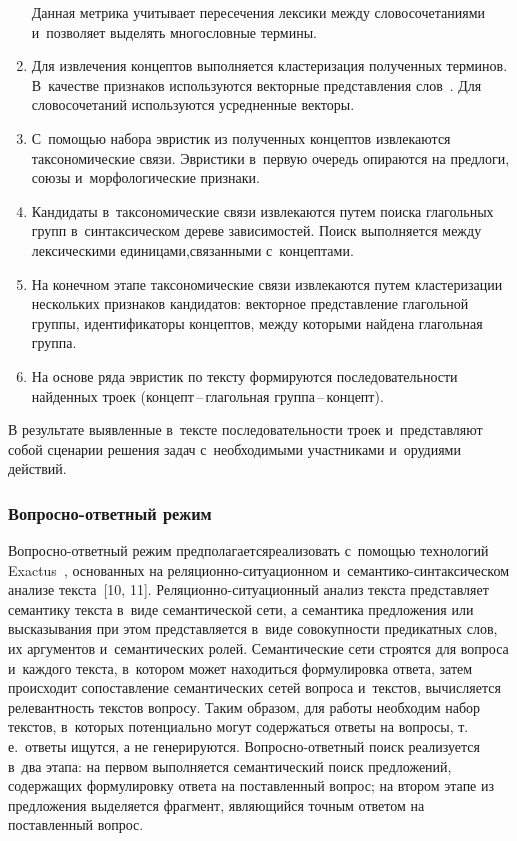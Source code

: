 \begin{multicols}{2}
\begin{enumerate}[1.]
  Данная метрика учитывает пересечения лексики между словосочетаниями 
и~позволяет выделять многословные термины.
  
  \item Для извлечения концептов выполняется клас\-те\-ри\-за\-ция полученных 
терминов. В~качестве признаков используются векторные пред\-став\-ле\-ния 
слов~\cite{8-sm}. Для словосочетаний используются усредненные векторы.
  \item С~помощью набора эвристик из полученных концептов извлекаются 
таксономические связи. Эвристики в~первую очередь опираются на предлоги, 
союзы и~морфологические признаки.
\item Кандидаты в~таксономические связи извлекаются путем поиска 
глагольных групп в~синтаксическом дереве зависимостей. Поиск вы\-полняется 
между лексическими единицами,\linebreak связанными с~концептами.
  \item На конечном этапе таксономические связи извлекаются путем 
кластеризации нескольких признаков кандидатов: векторное представление 
глагольной группы, идентификаторы концептов, между которыми найдена 
глагольная группа.
  \item  На основе ряда эвристик по тексту формируются последовательности 
найденных троек (кон\-цепт\,--\,гла\-голь\-ная груп\-па\,--\,кон\-цепт).
  \end{enumerate}
  
  В результате выявленные в~тексте последовательности троек и~представляют 
собой сценарии решения задач с~необходимыми участниками и~орудиями 
действий.
  
  \subsubsection{Вопросно-ответный режим} %
  
  Вопросно-ответный режим предполагается\linebreak реализовать с~помощью 
технологий Exactus~\cite{9-sm}, основанных на 
 ре\-ля\-ци\-он\-но-си\-ту\-а\-ци\-он\-ном и~се\-ман\-ти\-ко-син\-так\-си\-че\-ском 
анализе текста~[10, 11]. Ре\-ля\-ци\-он\-но-си\-ту\-а\-ци\-он\-ный анализ текста 
пред\-став\-ля\-ет семантику текста в~виде семантической сети, а семантика 
предложения или высказывания при этом пред\-став\-ля\-ет\-ся в~виде со\-во\-куп\-ности 
предикатных слов, их аргументов и~семантических ролей. Семантические сети 
строятся для вопроса и~каждого текста, в~котором может находиться 
формулировка ответа, затем происходит сопоставление семантических сетей 
вопроса и~текстов, вычисляется релевантность текстов вопросу. Таким образом, 
для работы необходим набор текстов, в~которых потенциально могут 
содержаться ответы на вопросы, т.\,е.\ ответы ищутся, а не генерируются.  
Воп\-рос\-но-от\-вет\-ный поиск реализуется в~два этапа: на первом 
выполняется семантический поиск предложений, содержащих формулировку 
ответа на поставленный вопрос; на втором этапе из предложения выделяется 
фрагмент, являющийся точным ответом на поставленный вопрос.
  

\end{multicols}

